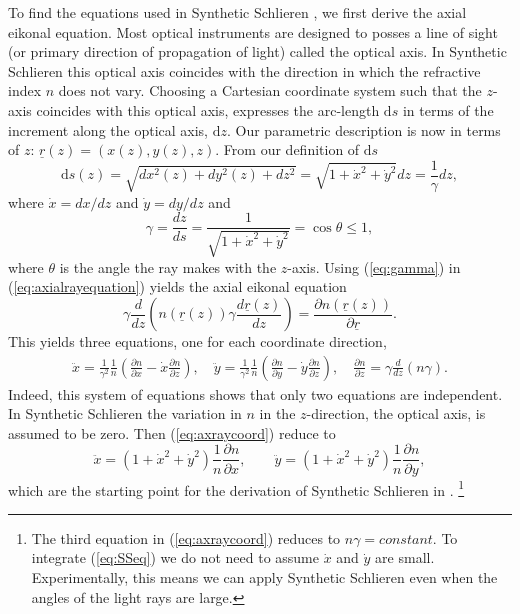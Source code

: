 \documentclass[draft]{svjour3}                     %
\begin{document}
To find the equations used in Synthetic Schlieren \cite{weyl1954analysis,dalziel2000whole}, we first derive the axial eikonal equation. Most optical instruments are designed to posses a line of sight (or primary direction of propagation of light) called the optical axis. In Synthetic Schlieren this optical axis coincides with the direction in which the refractive index $n$ does not vary. Choosing a Cartesian coordinate system such that the $z$-axis coincides with this optical axis, expresses the arc-length $\mathrm{d}s$ in terms of the increment along the optical axis, $\mathrm{d}z$. Our parametric description is now in terms of $z$: $\underline{r}(z) = (x(z), y(z), z)$. From our definition of $\mathrm{d}s$
\begin{equation}
	\mathrm{d}s(z) = \sqrt{dx^2(z) + dy^2(z) + dz^2} = \sqrt{1+\dot{x}^2 +\dot{y}^2} d z = \frac{1}{\gamma} d z,
\end{equation}
where $\dot{x} = d x / dz$ and $\dot{y} = dy/dz$ and 
\begin{equation}
	\label{eq:gamma}
	\gamma = \frac{d z}{d s} = \frac{1}{\sqrt{1+\dot{x}^2+\dot{y}^2}} = \cos \theta\leq 1,
\end{equation}
where $\theta$ is the angle the ray makes with the $z$-axis. Using (\ref{eq:gamma}) in (\ref{eq:axialrayequation}) yields the axial eikonal equation %
\begin{equation}
	\gamma \frac{d}{dz} \left(n(\underline{r}(z)) \gamma \frac{d \underline{r}(z)}{d z} \right)  = \frac{\partial n(\underline{r}(z))}{\partial \underline{r}}.
\end{equation}
This yields three equations, one for each coordinate direction,
\begin{equation}
	\label{eq:axraycoord}
	\begin{aligned}
		\ddot{x}  = \frac{1}{\gamma^2} \frac{1}{n} \left(\frac{\partial n}{\partial x} - \dot{x} \frac{\partial n}{\partial z} \right), \quad
		\ddot{y} = \frac{1}{\gamma^2} \frac{1}{n} \left(\frac{\partial n}{\partial y} - \dot{y} \frac{\partial n}{\partial z} \right), \quad
		\frac{\partial n}{\partial z} = \gamma \frac{d}{dz}\left(n  \gamma\right).
	\end{aligned}
\end{equation}	
Indeed, this system of equations shows that only two equations are independent. In Synthetic Schlieren the variation in $n$ in the $z$-direction, the optical axis, is assumed to be zero. Then (\ref{eq:axraycoord}) reduce to
\begin{equation}
	\label{eq:SSeq}
		\ddot{x} = \left(1+\dot{x}^2+\dot{y}^2\right) \frac{1}{n} \frac{\partial n}{\partial x}, \qquad
		\ddot{y} = \left(1+\dot{x}^2+\dot{y}^2\right) \frac{1}{n} \frac{\partial n}{\partial y},
\end{equation}
which are the starting point for the derivation of Synthetic Schlieren in \cite{dalziel2000whole}.  \footnote{The third equation in (\ref{eq:axraycoord}) reduces to $n \gamma = constant$.  To integrate (\ref{eq:SSeq}) we do not need to assume $\dot{x}$ and $\dot{y}$ are small. Experimentally, this means we can apply Synthetic Schlieren even when the angles of the light rays are large. }
\end{document}
